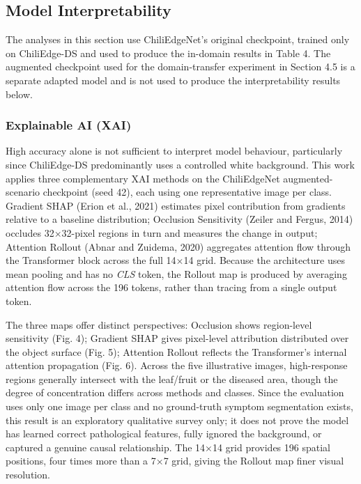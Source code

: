 \subsection{Model Interpretability}\label{model-interpretability}

The analyses in this section use ChiliEdgeNet's original checkpoint, trained only on ChiliEdge-DS and used to produce the in-domain results in Table 4. The augmented checkpoint used for the domain-transfer experiment in Section 4.5 is a separate adapted model and is not used to produce the interpretability results below.

\subsubsection{Explainable AI (XAI)}\label{explainable-ai-xai}

High accuracy alone is not sufficient to interpret model behaviour, particularly since ChiliEdge-DS predominantly uses a controlled white background. This work applies three complementary XAI methods on the ChiliEdgeNet augmented-scenario checkpoint (seed 42), each using one representative image per class. Gradient SHAP (Erion et al., 2021) estimates pixel contribution from gradients relative to a baseline distribution; Occlusion Sensitivity (Zeiler and Fergus, 2014) occludes 32×32-pixel regions in turn and measures the change in output; Attention Rollout (Abnar and Zuidema, 2020) aggregates attention flow through the Transformer block across the full 14×14 grid. Because the architecture uses mean pooling and has no \emph{CLS} token, the Rollout map is produced by averaging attention flow across the 196 tokens, rather than tracing from a single output token.

The three maps offer distinct perspectives: Occlusion shows region-level sensitivity (Fig. 4); Gradient SHAP gives pixel-level attribution distributed over the object surface (Fig. 5); Attention Rollout reflects the Transformer's internal attention propagation (Fig. 6). Across the five illustrative images, high-response regions generally intersect with the leaf/fruit or the diseased area, though the degree of concentration differs across methods and classes. Since the evaluation uses only one image per class and no ground-truth symptom segmentation exists, this result is an exploratory qualitative survey only; it does not prove the model has learned correct pathological features, fully ignored the background, or captured a genuine causal relationship. The 14×14 grid provides 196 spatial positions, four times more than a 7×7 grid, giving the Rollout map finer visual resolution.

